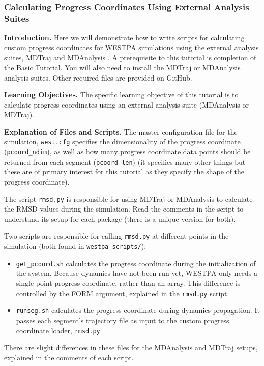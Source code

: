 \documentclass[9pt,tutorial]{livecoms}
\begin{document}
\subsubsection{Calculating Progress Coordinates Using External Analysis Suites}

\textbf{Introduction.} Here we will demonstrate how to write scripts for calculating custom progress coordinates for WESTPA simulations using the external analysis suites, MDTraj and MDAnalysis \citep{mda2011,mda2016,mdt2015}. 
A prerequisite to this tutorial is completion of the Basic Tutorial. 
You will also need to install the MDTraj or MDAnalysis analysis suites. 
Other required files are provided on GitHub.

\textbf{Learning Objectives.} The specific learning objective of this tutorial is to calculate progress coordinates using an external analysis suite (MDAnalysis or MDTraj). 

\textbf{Explanation of Files and Scripts.} The master configuration file for the simulation, \verb|west.cfg| specifies the dimensionality of the progress coordinate (\verb|pcoord_ndim|), as well as how many progress coordinate data points should be returned from each segment (\verb|pcoord_len|) (it specifies many other things but these are of primary interest for this tutorial as they specify the shape of the progress coordinate).

The script \verb|rmsd.py| is responsible for using MDTraj or MDAnalysis to calculate the RMSD values during the simulation. 
Read the comments in the script to understand its setup for each package (there is a unique version for both).

Two scripts are responsible for calling \verb|rmsd.py| at different points in the simulation (both found in \verb|westpa_scripts/|):
\begin{itemize}
\item \verb|get_pcoord.sh| calculates the progress coordinate during the initialization of the system. 
Because dynamics have not been run yet, WESTPA only needs a single point progress coordinate, rather than an array. 
This difference is controlled by the FORM argument, explained in the \verb|rmsd.py| script.
\item \verb|runseg.sh| calculates the progress coordinate during dynamics propagation. 
It passes each segment's trajectory file as input to the custom progress coordinate loader, \verb|rmsd.py|.
\end{itemize}

There are slight differences in these files for the MDAnalysis and MDTraj setups, explained in the comments of each script.
\end{document}
